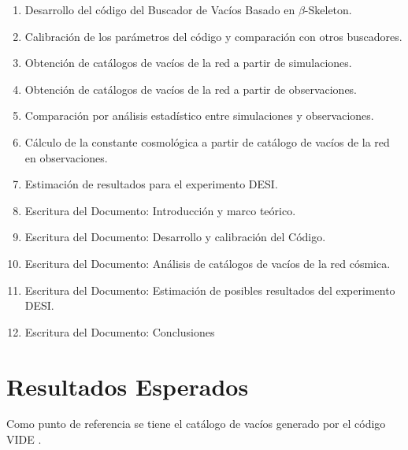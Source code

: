 \documentclass[preprint]{aastex62}
\begin{document}
  
  \begin{enumerate}
  \item Desarrollo del código del Buscador de Vacíos Basado en $\beta$-Skeleton.
  \item Calibración de los parámetros del código y comparación con otros buscadores.
  \item Obtención de catálogos de vacíos de la red a partir de simulaciones.
  \item Obtención de catálogos de vacíos de la red a partir de observaciones.
  \item Comparación por análisis estadístico entre simulaciones y observaciones.
  \item Cálculo de la constante cosmológica a partir de catálogo de vacíos de la red en
    observaciones.
  \item Estimación de resultados para el experimento DESI.
  \item Escritura del Documento: Introducción y marco teórico.
  \item Escritura del Documento: Desarrollo y calibración del Código.
  \item Escritura del Documento: Análisis de catálogos de vacíos de la red cósmica. 
  \item Escritura del Documento: Estimación de posibles resultados del experimento DESI.
  \item Escritura del Documento: Conclusiones
  \end{enumerate}
  
  
  \section{Resultados Esperados}

  Como punto de referencia se tiene el catálogo de vacíos generado por el código VIDE \citep{Sutter2015}.
  
    
  \nocite{*}
\end{document}
